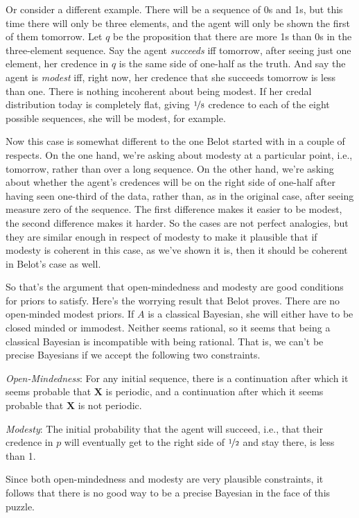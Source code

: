 \documentclass{ergoclass}
\newcommand{\vX}{\boldsymbol{X}}
\begin{document}
Or consider a different example. There will be a sequence of 0s and 1s, but this time there will only be three elements, and the agent will only be shown the first of them tomorrow. Let $q$ be the proposition that there are more 1s than 0s in the three-element sequence. Say the agent \textit{succeeds} iff tomorrow, after seeing just one element, her credence in $q$ is the same side of one-half as the truth. And say the agent is \textit{modest} iff, right now, her credence that she succeeds tomorrow is less than one. There is nothing incoherent about being modest. If her credal distribution today is completely flat, giving $\nicefrac{1}{8}$ credence to each of the eight possible sequences, she will be modest, for example. 

Now this case is somewhat different to the one Belot started with in a couple of respects. On the one hand, we're asking about modesty at a particular point, i.e., tomorrow, rather than over a long sequence. On the other hand, we're asking about whether the agent's credences will be on the right side of one-half after having seen one-third of the data, rather than, as in the original case, after seeing measure zero of the sequence. The first difference makes it easier to be modest, the second difference makes it harder. So the cases are not perfect analogies, but they are similar enough in respect of modesty to make it plausible that if modesty is coherent in this case, as we've shown it is, then it should be coherent in Belot's case as well.

So that's the argument that open-mindedness and modesty are good conditions for priors to satisfy. Here's the worrying result that Belot proves. There are no open-minded modest priors. If $A$ is a classical Bayesian, she will either have to be closed minded or immodest. Neither seems rational, so it seems that being a classical Bayesian is incompatible with being rational. That is, we can't be precise Bayesians if we accept the following two constraints.

%
\begin{itemize*}
\item \textit{Open-Mindedness}: For any initial sequence, there is a continuation after which it seems probable that $\vX$ is periodic, and a continuation after which it seems probable that $\vX$ is not periodic.
\item \textit{Modesty}: The initial probability that the agent will succeed, i.e., that their credence in $p$ will eventually get to the right side of $\nicefrac{1}{2}$ and stay there, is less than 1.
\end{itemize*}
%
Since both open-mindedness and modesty are very plausible constraints, it follows that there is no good way to be a precise Bayesian in the face of this puzzle.
\end{document}
